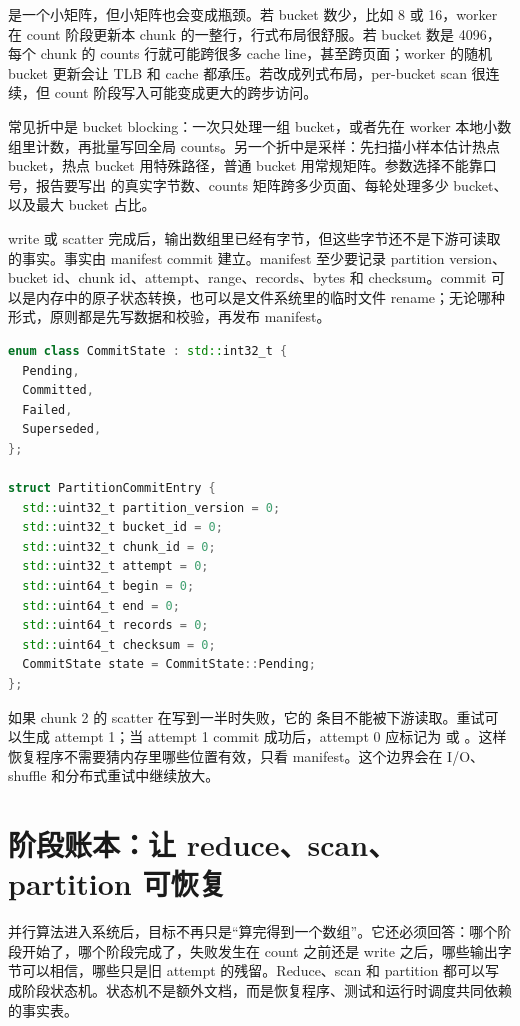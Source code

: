  是一个小矩阵，但小矩阵也会变成瓶颈。若 bucket 数少，比如 8 或 16，worker 在 count 阶段更新本 chunk 的一整行，行式布局很舒服。若 bucket 数是 4096，每个 chunk 的 counts 行就可能跨很多 cache line，甚至跨页面；worker 的随机 bucket 更新会让 TLB 和 cache 都承压。若改成列式布局，per-bucket scan 很连续，但 count 阶段写入可能变成更大的跨步访问。

常见折中是 bucket blocking：一次只处理一组 bucket，或者先在 worker 本地小数组里计数，再批量写回全局 counts。另一个折中是采样：先扫描小样本估计热点 bucket，热点 bucket 用特殊路径，普通 bucket 用常规矩阵。参数选择不能靠口号，报告要写出  的真实字节数、counts 矩阵跨多少页面、每轮处理多少 bucket、以及最大 bucket 占比。

write 或 scatter 完成后，输出数组里已经有字节，但这些字节还不是下游可读取的事实。事实由 manifest commit 建立。manifest 至少要记录 partition version、bucket id、chunk id、attempt、range、records、bytes 和 checksum。commit 可以是内存中的原子状态转换，也可以是文件系统里的临时文件 rename；无论哪种形式，原则都是先写数据和校验，再发布 manifest。

\begin{lstlisting}[language=C++,caption={partition commit 条目的扩展示例}]
enum class CommitState : std::int32_t {
  Pending,
  Committed,
  Failed,
  Superseded,
};

struct PartitionCommitEntry {
  std::uint32_t partition_version = 0;
  std::uint32_t bucket_id = 0;
  std::uint32_t chunk_id = 0;
  std::uint32_t attempt = 0;
  std::uint64_t begin = 0;
  std::uint64_t end = 0;
  std::uint64_t records = 0;
  std::uint64_t checksum = 0;
  CommitState state = CommitState::Pending;
};
\end{lstlisting}

如果 chunk 2 的 scatter 在写到一半时失败，它的  条目不能被下游读取。重试可以生成 attempt 1；当 attempt 1 commit 成功后，attempt 0 应标记为  或 。这样恢复程序不需要猜内存里哪些位置有效，只看 manifest。这个边界会在 I/O、shuffle 和分布式重试中继续放大。

\section{阶段账本：让 reduce、scan、partition 可恢复}

并行算法进入系统后，目标不再只是“算完得到一个数组”。它还必须回答：哪个阶段开始了，哪个阶段完成了，失败发生在 count 之前还是 write 之后，哪些输出字节可以相信，哪些只是旧 attempt 的残留。Reduce、scan 和 partition 都可以写成阶段状态机。状态机不是额外文档，而是恢复程序、测试和运行时调度共同依赖的事实表。

